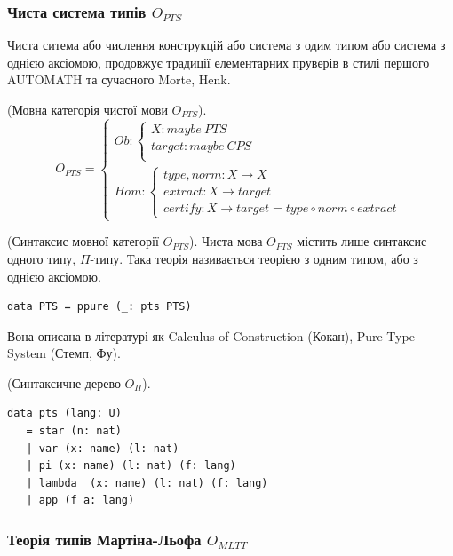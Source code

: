 \begin{definition}
\newpage

\subsubsection{Чиста система типів $O_{PTS}$}

Чиста ситема або числення конструкцій або система з одим типом або
система з однією аксіомою, продовжує традиції елементарних пруверів
в стилі першого AUTOMATH та сучасного Morte, Henk.

\begin{definition} (Мовна категорія чистої мови $O_{PTS}$).
$$
O_{PTS} =
\begin{cases}
Ob: \begin{cases}
X: maybe\ PTS \\
target: maybe\ CPS \\
\end{cases} \\
Hom: \begin{cases}
type,norm: X \rightarrow X \\
extract: X \rightarrow target \\
certify: X \rightarrow target = type \circ norm \circ extract
\end{cases}
\end{cases}
$$
\end{definition}

\begin{definition} (Синтаксис мовної категорії $O_{PTS}$).
Чиста мова $O_{PTS}$ містить лише синтаксис одного типу, $\Pi$-типу.
Така теорія називається теорією з одним типом, або з однією аксіомою.
\begin{lstlisting}[mathescape=true]
data PTS = ppure (_: pts PTS)
\end{lstlisting}
\end{definition}

Вона описана в літературі як Calculus of Construction (Кокан),
Pure Type System (Стемп, Фу).

\begin{definition} (Синтаксичне дерево $O_\Pi$).
\begin{lstlisting}[mathescape=true]
data pts (lang: U)
   = star (n: nat)
   | var (x: name) (l: nat)
   | pi (x: name) (l: nat) (f: lang)
   | lambda  (x: name) (l: nat) (f: lang)
   | app (f a: lang)
\end{lstlisting}
\end{definition}

\newpage
\subsubsection{Теорія типів Мартіна-Льофа $O_{MLTT}$}


\end{definition}
